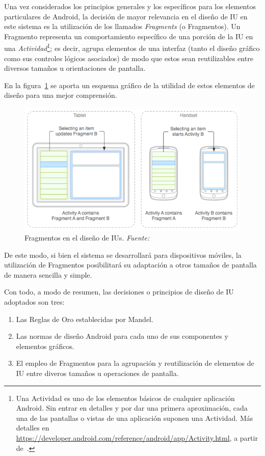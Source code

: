 Una vez considerados los principios generales y los específicos para los elementos particulares de Android, la decisión de mayor relevancia en el diseño de IU en este sistema es la utilización de los llamados \emph{Fragments} (o Fragmentos). Un Fragmento representa un comportamiento específico de una porción de la IU en una \emph{Actividad}\footnote{Una Actividad es uno de los elementos básicos de cualquier aplicación Android. Sin entrar en detalles y por dar una primera aproximación, cada una de las pantallas o vistas de una aplicación suponen una Actividad. Más detalles en \url{https://developer.android.com/reference/android/app/Activity.html}, a partir de~\cite{AnDev}.}; es decir, agrupa elementos de una interfaz (tanto el diseño gráfico como sus controles lógicos asociados) de modo que estos sean reutilizables entre diversos tamaños u orientaciones de pantalla.

En la figura~\ref{fig:fragmentsAndroid} se aporta un esquema gráfico de la utilidad de estos elementos de diseño para una mejor comprensión.

\begin{figure} [!htb]
	\centering
	\includegraphics[width=\linewidth,height=\textheight,keepaspectratio]{Images/FragmentsAndroid}
	\caption[Fragmentos en el diseño de IUs]{Fragmentos en el diseño de IUs. \textit{Fuente:~\cite{AnDev}}}
	\label{fig:fragmentsAndroid}
\end{figure}

De este modo, si bien el sistema se desarrollará para dispositivos móviles, la utilización de Fragmentos posibilitará su adaptación a otros tamaños de pantalla de manera sencilla y simple.

Con todo, a modo de resumen, las decisiones o principios de diseño de IU adoptados son tres:

\begin{enumerate}
	\item{Las Reglas de Oro establecidas por Mandel}.
	\item{Las normas de diseño Android para cada uno de sus componentes y elementos gráficos}.
	\item{El empleo de Fragmentos para la agrupación y reutilización de elementos de IU entre diveros tamaños u operaciones de pantalla}.
\end{enumerate}

